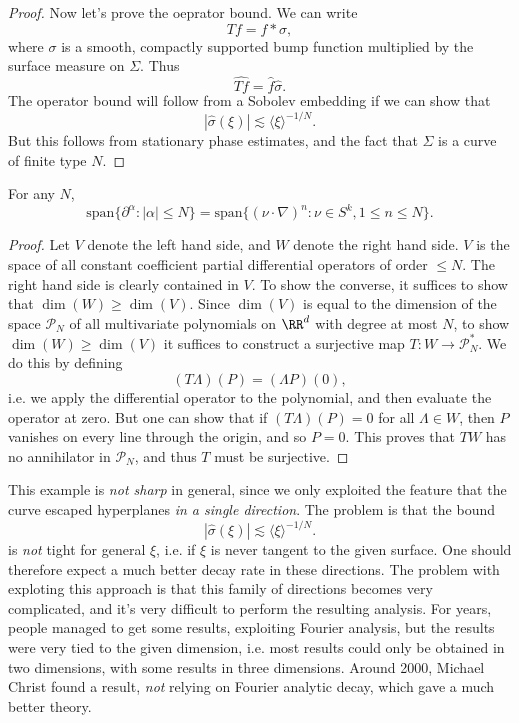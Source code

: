 \begin{proof}
    Now let's prove the oeprator bound. We can write
    \[ Tf = f * \sigma,  \]
    where $\sigma$ is a smooth, compactly supported bump function multiplied by the surface measure on $\Sigma$. Thus
    \[ \widehat{Tf} = \widehat{f} \widehat{\sigma}. \]
    The operator bound will follow from a Sobolev embedding if we can show that
    \[ |\widehat{\sigma}(\xi)| \lesssim \langle \xi \rangle^{-1/N}. \]
    But this follows from stationary phase estimates, and the fact that $\Sigma$ is a curve of finite type $N$.
\end{proof}

\begin{lemma}
    For any $N$,
    \[ \text{span} \{ \partial^\alpha : |\alpha| \leq N \} = \text{span} \{ (\nu \cdot \nabla)^n : \nu \in S^k, 1 \leq n \leq N \}. \]
\end{lemma}
\begin{proof}
    Let $V$ denote the left hand side, and $W$ denote the right hand side. $V$ is the space of all constant coefficient partial differential operators of order $\leq N$. The right hand side is clearly contained in $V$. To show the converse, it suffices to show that $\dim(W) \geq \dim(V)$. Since $\dim(V)$ is equal to the dimension of the space $\mathcal{P}_N$ of all multivariate polynomials on $\RR^d$ with degree at most $N$, to show $\dim(W) \geq \dim(V)$ it suffices to construct a surjective map $T: W \to \mathcal{P}_N^*$. We do this by defining
    \[ (T\Lambda)(P) = (\Lambda P)(0), \]
    i.e. we apply the differential operator to the polynomial, and then evaluate the operator at zero. But one can show that if $(T \Lambda)(P) = 0$ for all $\Lambda \in W$, then $P$ vanishes on every line through the origin, and so $P = 0$. This proves that $TW$ has no annihilator in $\mathcal{P}_N$, and thus $T$ must be surjective.
\end{proof}

This example is \emph{not sharp} in general, since we only exploited the feature that the curve escaped hyperplanes \emph{in a single direction}. The problem is that the bound
%
\[ |\widehat{\sigma}(\xi)| \lesssim \langle \xi \rangle^{-1/N}. \]
%
is \emph{not} tight for general $\xi$, i.e. if $\xi$ is never tangent to the given surface. One should therefore expect a much better decay rate in these directions. The problem with exploting this approach is that this family of directions becomes very complicated, and it's very difficult to perform the resulting analysis. For years, people managed to get some results, exploiting Fourier analysis, but the results were very tied to the given dimension, i.e. most results could only be obtained in two dimensions, with some results in three dimensions. Around 2000, Michael Christ found a result, \emph{not} relying on Fourier analytic decay, which gave a much better theory.

